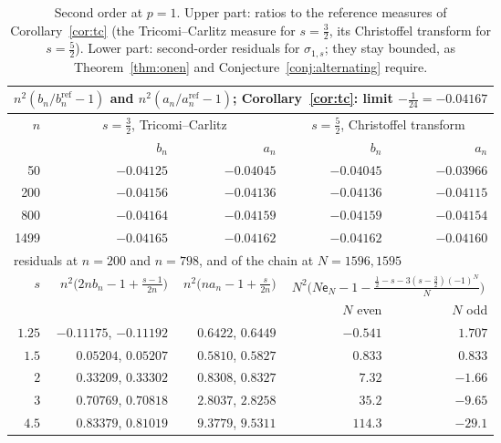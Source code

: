 \begin{table}[ht]
\centering
\small
\begin{tabular}{rrrrr}
\toprule
\multicolumn{5}{l}{$n^2(b_n/b^{\mathrm{ref}}_n-1)$ and $n^2(a_n/a^{\mathrm{ref}}_n-1)$; Corollary~\ref{cor:tc}: limit $-\frac1{24}=-0.04167$}\\
\midrule
$n$ & \multicolumn{2}{c}{$s=\frac32$, Tricomi--Carlitz} & \multicolumn{2}{c}{$s=\frac52$, Christoffel transform}\\
\cmidrule(lr){2-3}\cmidrule(lr){4-5}
 & $b_n$ & $a_n$ & $b_n$ & $a_n$\\
\midrule
50 & $-0.04125$ & $-0.04045$ & $-0.04045$ & $-0.03966$\\
200 & $-0.04156$ & $-0.04136$ & $-0.04136$ & $-0.04115$\\
800 & $-0.04164$ & $-0.04159$ & $-0.04159$ & $-0.04154$\\
1499 & $-0.04165$ & $-0.04162$ & $-0.04162$ & $-0.04160$\\
\midrule
\multicolumn{5}{l}{residuals at $n=200$ and $n=798$, and of the chain at $N=1596,1595$}\\
\midrule
$s$ & $n^2\bigl(2nb_n-1+\frac{s-1}{2n}\bigr)$ & $n^2\bigl(na_n-1+\frac s{2n}\bigr)$ & \multicolumn{2}{c}{$N^2\bigl(N\mathsf e_N-1-\frac{\frac12-s-3(s-\frac32)(-1)^N}N\bigr)$}\\
\cmidrule(lr){4-5}
 & & & $N$ even & $N$ odd\\
\midrule
$1.25$ & $-0.11175$, $-0.11192$ & $0.6422$, $0.6449$ & $-0.541$ & $1.707$\\
$1.5$ & $0.05204$, $0.05207$ & $0.5810$, $0.5827$ & $0.833$ & $0.833$\\
$2$ & $0.33209$, $0.33302$ & $0.8308$, $0.8327$ & $7.32$ & $-1.66$\\
$3$ & $0.70769$, $0.70818$ & $2.8037$, $2.8258$ & $35.2$ & $-9.65$\\
$4.5$ & $0.83379$, $0.81019$ & $9.3779$, $9.5311$ & $114.3$ & $-29.1$\\
\bottomrule
\end{tabular}
\caption{Second order at $p=1$. Upper part: ratios to the reference measures of Corollary~\ref{cor:tc} (the
Tricomi--Carlitz measure for $s=\frac32$, its Christoffel transform for $s=\frac52$). Lower part: second-order residuals
for $\sigma_{1,s}$; they stay bounded, as Theorem~\ref{thm:onen} and Conjecture~\ref{conj:alternating} require.}
\label{tab:pone}
\end{table}

